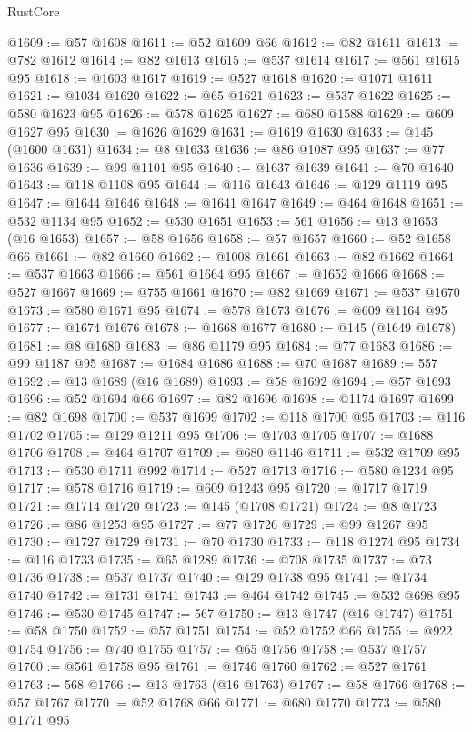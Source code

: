 \begin{lexlean}{RustCore}
\begin{coremodule}
@1609 := @57 @1608
@1611 := @52 @1609 @66
@1612 := @82 @1611
@1613 := @782 @1612
@1614 := @82 @1613
@1615 := @537 @1614
@1617 := @561 @1615 @95
@1618 := @1603 @1617
@1619 := @527 @1618
@1620 := @1071 @1611
@1621 := @1034 @1620
@1622 := @65 @1621
@1623 := @537 @1622
@1625 := @580 @1623 @95
@1626 := @578 @1625
@1627 := @680 @1588
@1629 := @609 @1627 @95
@1630 := @1626 @1629
@1631 := @1619 @1630
@1633 := @145 (@1600 @1631)
@1634 := @8 @1633
@1636 := @86 @1087 @95
@1637 := @77 @1636
@1639 := @99 @1101 @95
@1640 := @1637 @1639
@1641 := @70 @1640
@1643 := @118 @1108 @95
@1644 := @116 @1643
@1646 := @129 @1119 @95
@1647 := @1644 @1646
@1648 := @1641 @1647
@1649 := @464 @1648
@1651 := @532 @1134 @95
@1652 := @530 @1651
@1653 := 561
@1656 := @13 @1653 (@16 @1653)
@1657 := @58 @1656
@1658 := @57 @1657
@1660 := @52 @1658 @66
@1661 := @82 @1660
@1662 := @1008 @1661
@1663 := @82 @1662
@1664 := @537 @1663
@1666 := @561 @1664 @95
@1667 := @1652 @1666
@1668 := @527 @1667
@1669 := @755 @1661
@1670 := @82 @1669
@1671 := @537 @1670
@1673 := @580 @1671 @95
@1674 := @578 @1673
@1676 := @609 @1164 @95
@1677 := @1674 @1676
@1678 := @1668 @1677
@1680 := @145 (@1649 @1678)
@1681 := @8 @1680
@1683 := @86 @1179 @95
@1684 := @77 @1683
@1686 := @99 @1187 @95
@1687 := @1684 @1686
@1688 := @70 @1687
@1689 := 557
@1692 := @13 @1689 (@16 @1689)
@1693 := @58 @1692
@1694 := @57 @1693
@1696 := @52 @1694 @66
@1697 := @82 @1696
@1698 := @1174 @1697
@1699 := @82 @1698
@1700 := @537 @1699
@1702 := @118 @1700 @95
@1703 := @116 @1702
@1705 := @129 @1211 @95
@1706 := @1703 @1705
@1707 := @1688 @1706
@1708 := @464 @1707
@1709 := @680 @1146
@1711 := @532 @1709 @95
@1713 := @530 @1711 @992
@1714 := @527 @1713
@1716 := @580 @1234 @95
@1717 := @578 @1716
@1719 := @609 @1243 @95
@1720 := @1717 @1719
@1721 := @1714 @1720
@1723 := @145 (@1708 @1721)
@1724 := @8 @1723
@1726 := @86 @1253 @95
@1727 := @77 @1726
@1729 := @99 @1267 @95
@1730 := @1727 @1729
@1731 := @70 @1730
@1733 := @118 @1274 @95
@1734 := @116 @1733
@1735 := @65 @1289
@1736 := @708 @1735
@1737 := @73 @1736
@1738 := @537 @1737
@1740 := @129 @1738 @95
@1741 := @1734 @1740
@1742 := @1731 @1741
@1743 := @464 @1742
@1745 := @532 @698 @95
@1746 := @530 @1745
@1747 := 567
@1750 := @13 @1747 (@16 @1747)
@1751 := @58 @1750
@1752 := @57 @1751
@1754 := @52 @1752 @66
@1755 := @922 @1754
@1756 := @740 @1755
@1757 := @65 @1756
@1758 := @537 @1757
@1760 := @561 @1758 @95
@1761 := @1746 @1760
@1762 := @527 @1761
@1763 := 568
@1766 := @13 @1763 (@16 @1763)
@1767 := @58 @1766
@1768 := @57 @1767
@1770 := @52 @1768 @66
@1771 := @680 @1770
@1773 := @580 @1771 @95

\end{coremodule}
\end{lexlean}
